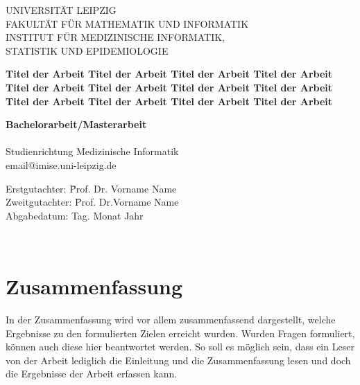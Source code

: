 \documentclass[headsepline,titlepage,twoside,12pt]{report}
\author{Vorname Name}
\begin{document}
\allowdisplaybreaks%

\begin{titlepage}
\thispagestyle{empty}
\begin{center}


{\large UNIVERSITÄT LEIPZIG\\[1mm]}
FAKULTÄT FÜR MATHEMATIK UND INFORMATIK\\
INSTITUT FÜR MEDIZINISCHE INFORMATIK,\\STATISTIK UND EPIDEMIOLOGIE\\

\vspace{2cm}

{\large\textbf{Titel der Arbeit Titel der Arbeit Titel der Arbeit Titel der Arbeit Titel der Arbeit Titel der Arbeit Titel der Arbeit Titel der Arbeit Titel der Arbeit Titel der Arbeit Titel der Arbeit Titel der Arbeit}}\\
\vspace*{4cm}


{\Huge\textbf{Bachelorarbeit/Masterarbeit}}\\
\vspace*{2cm}
{\Large\makeatletter\@author\makeatother\\
Studienrichtung Medizinische Informatik\\
email@imise.uni-leipzig.de
}\\

\vspace{2cm}

\parbox{1cm}{
\begin{large}
\begin{tabbing}
Erstgutachter: \hspace{.4cm} \=Prof. Dr. Vorname Name \\[2mm]
Zweitgutachter: \> \=Prof. Dr.Vorname Name\\[2mm]
Abgabedatum: \> Tag. Monat Jahr\\
\end{tabbing}
\end{large}}\\

\end{center}
\end{titlepage}

\tableofcontents

\chapter*{Zusammenfassung}
In der Zusammenfassung wird vor allem zusammenfassend dargestellt, welche Ergebnisse zu den formulierten Zielen erreicht wurden. Wurden Fragen formuliert, können auch diese hier beantwortet werden. So soll es möglich sein, dass ein Leser von der Arbeit lediglich die Einleitung und die Zusammenfassung lesen und doch die Ergebnisse der Arbeit erfassen kann.
\end{document}
